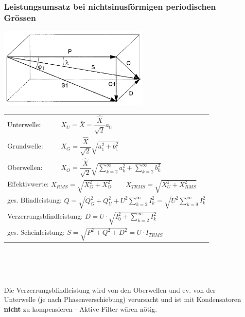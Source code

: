 		\subsubsection{Leistungsumsatz bei nichtsinusf\"ormigen periodischen Gr\"ossen}
		\begin{minipage}[c]{7.5cm}
			\includegraphics[height=4cm]{bilder/ZeigerdiagrammNichtSinus.png}     
    	\end{minipage}
		\begin{minipage}[c]{10.5cm}   
    		\noindent
    		\renewcommand{\arraystretch}{2.5}
    		\begin{tabular}{p{1.8cm} p{5.6cm}}
        		Unterwelle: 
        		& $X_{U} = \overline{X} = \dfrac{\hat{X}}{\sqrt{2}} a_0 \qquad $  \\
	     		Grundwelle: 
	     		& $X_{G} = \dfrac{\hat{X}}{\sqrt{2}} \sqrt{a_1^2 + b_1^2} \qquad  $   \\
	     		Oberwellen: 
	     		& $X_{O} = \dfrac{\hat{X}}{\sqrt{2}}
	     		\sqrt{\sum\limits_{k=2}^{\infty}a_k^2 +\sum\limits_{k=2}^{\infty}b_k^2}
	     		\qquad $  \\ \multicolumn{2}{l}{Effektivwerte: $X_{RMS} = \sqrt{X_G^2 + X_O^2} \qquad X_{TRMS} =
	     		\sqrt{X_U^2 + X_{RMS}^2}$ } \\
		\multicolumn{2}{l}{ges. Blindleistung: $Q = \sqrt{Q_G^2 + Q_U^2 + U^2
		\sum\limits_{k=2}^{\infty}I_k^2} = \sqrt{U^2 \sum\limits_{k=0}^{\infty}I_k^2}$} \\ 
		\multicolumn{2}{l}{Verzerrungsblindleistung: $D = U
		\cdot \sqrt{I_0^2 + \sum\limits_{k=2}^{\infty}I_k^2}$} \\
		\multicolumn{2}{l}{ges. Scheinleistung: $S = \sqrt{P^2 + Q^2 + D^2} = U \cdot I_{TRMS}$} \\
		 \end{tabular} \\
		 \renewcommand{\arraystretch}{1}
     	\end{minipage}    		\\ \\
     	Die Verzerrungsblindleistung wird von den Oberwellen und ev. von der Unterwelle (je
     	nach Phasenverschiebung) verursacht und ist mit Kondensatoren \textbf{nicht} zu kompensieren -
     	Aktive Filter w\"aren n\"otig.
		\\		
		
